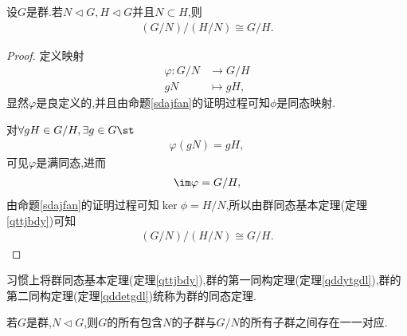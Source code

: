 \begin{theorem}[群的第二同构定理]\label{qddetgdl}
    设$G$是群.若$N\lhd G,H\lhd G$并且$N\subset H$,则\begin{align*}
        (G/N)/(H/N)\cong G/H.
    \end{align*}
\end{theorem}
\begin{proof}
    定义映射\begin{align*}
        \varphi:G/N&\to G/H\\
        gN&\mapsto gH,
    \end{align*}显然$\varphi$是良定义的,并且由命题\ref{sdajfan}的证明过程可知$\phi$是同态映射.

    对$\forall gH\in G/H,\exists g\in G\st$\begin{align*}
        \varphi(gN)=gH,
    \end{align*}可见$\varphi$是满同态,进而\begin{align*}
        \im\varphi=G/H,
    \end{align*}由命题\ref{sdajfan}的证明过程可知$\ker\phi=H/N$,所以由群同态基本定理(定理\ref{qttjbdy})可知\begin{align*}
        (G/N)/(H/N)\cong G/H.
    \end{align*}
\end{proof}
\begin{remark}
    习惯上将群同态基本定理(定理\ref{qttjbdy}),群的第一同构定理(定理\ref{qddytgdl}),群的第二同构定理(定理\ref{qddetgdl})统称为群的同态定理.
\end{remark}
\begin{theorem}
    若$G$是群,$N\lhd G$,则$G$的所有包含$N$的子群与$G/N$的所有子群之间存在一一对应.
\end{theorem}
